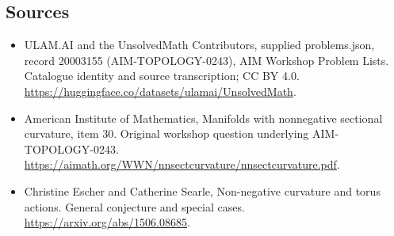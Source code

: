 \documentclass[11pt,a4paper]{article}
\begin{document}
\subsection{Sources}
\begin{itemize}
\item[S1] ULAM.AI and the UnsolvedMath Contributors, supplied problems.json, record 20003155 (AIM-TOPOLOGY-0243), AIM Workshop Problem Lists. Catalogue identity and source transcription; CC BY 4.0.
\url{https://huggingface.co/datasets/ulamai/UnsolvedMath}.
\item[S2] American Institute of Mathematics, Manifolds with nonnegative sectional curvature, item 30. Original workshop question underlying AIM-TOPOLOGY-0243.
\url{https://aimath.org/WWN/nnsectcurvature/nnsectcurvature.pdf}.
\item[S3] Christine Escher and Catherine Searle, Non-negative curvature and torus actions. General conjecture and special cases.
\url{https://arxiv.org/abs/1506.08685}.
\end{itemize}
\end{document}
